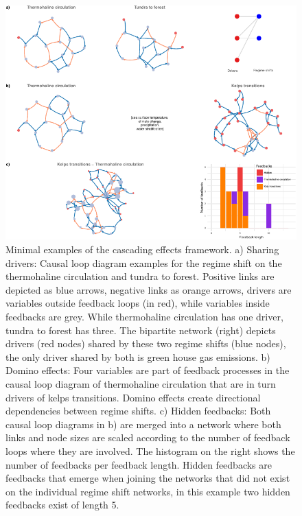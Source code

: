 \documentclass[9pt,]{article}
\begin{document}
\begin{figure}

{\centering \includegraphics{170830_draftCascadingEffects_files/figure-latex/Fig2-1} 

}

\caption{Minimal examples of the cascading effects framework. a) Sharing drivers: Causal loop diagram examples for the regime shift on the thermohaline circulation and tundra to forest. Positive links are depicted as blue arrows, negative links as orange arrows, drivers are variables outside feedback loops (in red), while variables inside feedbacks are grey. While thermohaline circulation has one driver, tundra to forest has three. The bipartite network (right) depicts drivers (red nodes) shared by these two regime shifts (blue nodes), the only driver shared by both is green house gas emissions. b) Domino effects: Four variables are part of feedback processes in the causal loop diagram of thermohaline circulation that are in turn drivers of kelps transitions. Domino effects create directional dependencies between regime shifts. c) Hidden feedbacks: Both causal loop diagrams in b) are merged into a network where both links and node sizes are scaled according to the number of feedback loops where they are involved. The histogram on the right shows the number of feedbacks per feedback length. Hidden feedbacks are feedbacks that emerge when joining the networks that did not exist on the individual regime shift networks, in this example two hidden feedbacks exist of length 5.}\label{fig:Fig2}
\end{figure}
\end{document}
